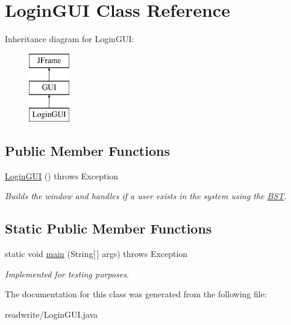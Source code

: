 \hypertarget{class_login_g_u_i}{}\section{Login\+G\+UI Class Reference}
\label{class_login_g_u_i}
Inheritance diagram for Login\+G\+UI\+:\begin{figure}[H]
\begin{center}
\leavevmode
\includegraphics[height=3.000000cm]{class_login_g_u_i}
\end{center}
\end{figure}
\subsection*{Public Member Functions}
\begin{DoxyCompactItemize}
\item 
\mbox{\label{class_login_g_u_i_a37fd25505687793a026b91708cbb2d1a}} 
\hyperlink{class_login_g_u_i_a37fd25505687793a026b91708cbb2d1a}{Login\+G\+UI} ()  throws Exception 
\begin{DoxyCompactList}\small\item\em Builds the window and handles if a user exists in the system using the \hyperlink{class_b_s_t}{B\+ST}. \end{DoxyCompactList}\end{DoxyCompactItemize}
\subsection*{Static Public Member Functions}
\begin{DoxyCompactItemize}
\item 
\mbox{\label{class_login_g_u_i_a4b8e369327f04ab3c9fb11886c5f1dbb}} 
static void \hyperlink{class_login_g_u_i_a4b8e369327f04ab3c9fb11886c5f1dbb}{main} (String\mbox{[}$\,$\mbox{]} args)  throws Exception 	
\begin{DoxyCompactList}\small\item\em Implemented for testing purposes. \end{DoxyCompactList}\end{DoxyCompactItemize}


The documentation for this class was generated from the following file\+:\begin{DoxyCompactItemize}
\item 
readwrite/Login\+G\+U\+I.\+java\end{DoxyCompactItemize}
